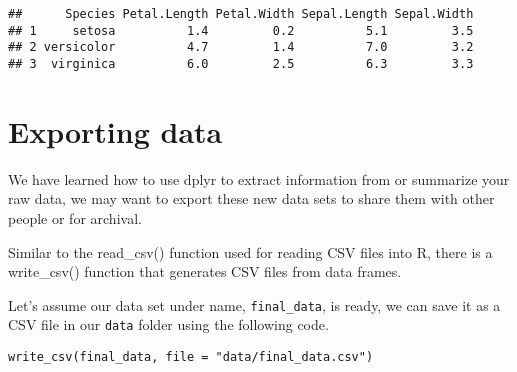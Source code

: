 \documentclass[
]{article}
\begin{document}
\begin{verbatim}
##      Species Petal.Length Petal.Width Sepal.Length Sepal.Width
## 1     setosa          1.4         0.2          5.1         3.5
## 2 versicolor          4.7         1.4          7.0         3.2
## 3  virginica          6.0         2.5          6.3         3.3
\end{verbatim}

\hypertarget{exporting-data}{%
\section{Exporting data}\label{exporting-data}}

We have learned how to use dplyr to extract information from or
summarize your raw data, we may want to export these new data sets to
share them with other people or for archival.

Similar to the read\_csv() function used for reading CSV files into R,
there is a write\_csv() function that generates CSV files from data
frames.

Let's assume our data set under name, \texttt{final\_data}, is ready, we
can save it as a CSV file in our \texttt{data} folder using the
following code.

\texttt{write\_csv(final\_data,\ file\ =\ "data/final\_data.csv")}
\end{document}
